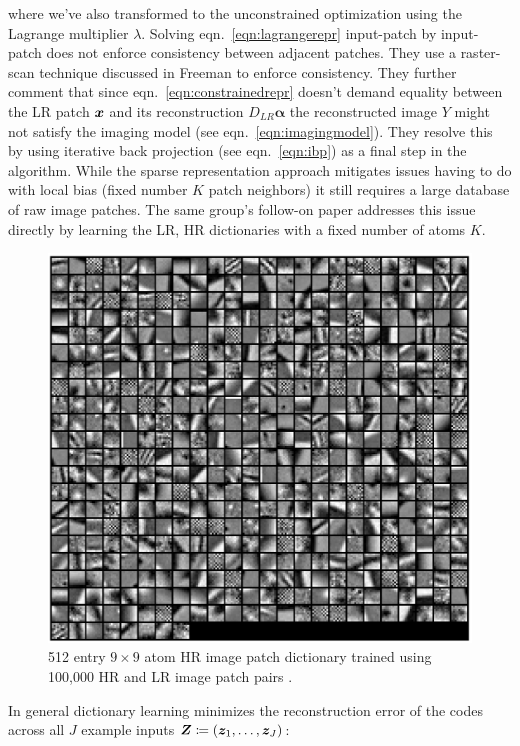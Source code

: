 where we've also transformed to the unconstrained optimization using the Lagrange multiplier \(\lambda\).
%
Solving eqn.~\eqref{eqn:lagrangerepr} input-patch by input-patch does not enforce consistency between adjacent patches.
%
They use a raster-scan technique discussed in Freeman \etal \cite{freeman2002example} to enforce consistency.
%
They further comment that since eqn.~\eqref{eqn:constrainedrepr} doesn't demand equality between the LR patch \(\bm{x}\) and its reconstruction \(D_{LR}\bm{\alpha}\) the reconstructed image \(Y\) might not satisfy the imaging model (see eqn.~\eqref{eqn:imagingmodel}).
%
They resolve this by using iterative back projection (see eqn.~\eqref{eqn:ibp}) as a final step in the algorithm.
%
While the sparse representation approach mitigates issues having to do with local bias (fixed number \(K\) patch neighbors) it still requires a large database of raw image patches.
%
The same group's follow-on paper \cite{yang2010} addresses this issue directly by learning the LR, HR dictionaries with a fixed number of atoms \(K\).
\begin{figure}[!htbp]
    \centering
    \includegraphics[width=\linewidth,keepaspectratio]{figures/classical/dictpatches.png}
    \caption{512 entry \(9 \times 9\) atom HR image patch dictionary trained using 100,000 HR and LR image patch pairs \cite{yang2010}.}
    \label{fig:hrpatchdict}
\end{figure}
%
In general dictionary learning minimizes the reconstruction error of the codes across all \(J\) example inputs \(\bm{Z} \coloneqq \left( \bm{z}_1, \mathellipsis, \bm{z}_J \right)\):
